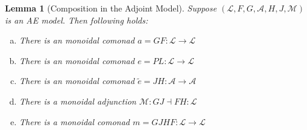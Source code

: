 \documentclass{article}
\newtheorem{lemma}[theorem]{Lemma}
\let\mto\to
\let\to\relax
\newcommand{\to}{\rightarrow}
\newcommand{\cat}[1]{\mathcal{#1}}
\begin{document}
\begin{lemma}[Composition in the Adjoint Model]
  \label{lemma:composition_in_the_adjoint_model}
  Suppose $(\cat{L},F,G,\cat{A},H,J,\cat{M})$ is an AE model.  Then
  following holds:
  \begin{enumerate}[a.]
  \item There is an monoidal comonad $a = GF : \cat{L} \mto \cat{L}$
  \item There is an monoidal comonad $e = PL : \cat{L} \mto \cat{L}$
  \item There is an monoidal comonad $\widetilde{e} = JH : \cat{A} \mto \cat{A}$
  \item There is a monoidal adjunction $\cat{M} : GJ \dashv FH : \cat{L}$
  \item There is a monoidal comonad $m = GJHF : \cat{L} \mto \cat{L}$
  \end{enumerate}
\end{lemma}




\begin{comment}
  
\end{comment}
\nocite{*}  
\end{document}
